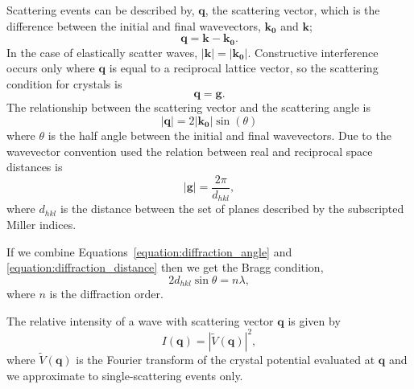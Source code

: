 Scattering events can be described by, $\mathbf{q}$, the scattering vector, which is the difference between the initial and final wavevectors, $\mathbf{k_0}$ and $\mathbf{k}$;
\begin{equation}
\mathbf{q} = \mathbf{k} - \mathbf{k_0}.
\end{equation}
In the case of elastically scatter waves, $|\mathbf{k}| = |\mathbf{k_0}|$.
Constructive interference occurs only where $\mathbf{q}$ is equal to a reciprocal lattice vector, so the scattering condition for crystals is
\begin{equation}
\mathbf{q} = \mathbf{g}.
\end{equation}
The relationship between the scattering vector and the scattering angle is
\begin{equation}\label{equation:diffraction_angle}
\left|\mathbf{q}\right| = 2\left|\mathbf{k_0}\right|\sin(\theta)
\end{equation}
where $\theta$ is the half angle between the initial and final wavevectors.
Due to the wavevector convention used the relation between real and reciprocal space distances is
\begin{equation}\label{equation:diffraction_distance}
\left|\mathbf{g}\right| = \frac{2\pi}{d_{hkl}},
\end{equation}
where $d_{hkl}$ is the distance between the set of planes described by the subscripted Miller indices.

If we combine Equations~\ref{equation:diffraction_angle} and \ref{equation:diffraction_distance} then we get the Bragg condition,
\begin{equation}
2d_{hkl}\sin\theta = n\lambda,
\end{equation}
where $n$ is the diffraction order.

The relative intensity of a wave with scattering vector $\mathbf{q}$ is given by
\begin{equation}
I(\mathbf{q}) = \left|\tilde{V}(\mathbf{q})\right|^2,
\end{equation}
where $\tilde{V}(\mathbf{q})$ is the Fourier transform of the crystal potential evaluated at $\mathbf{q}$ and we approximate to single-scattering events only.

